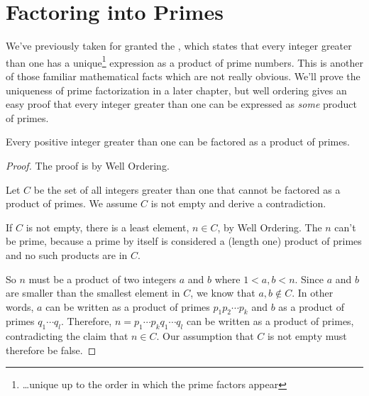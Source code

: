 \begin{problems}
\practiceproblems
{}

\classproblems
{}

\homeworkproblems
{}

\examproblems
{}
\end{problems}

\section{Factoring into Primes}

We've previously taken for granted the , which states that every integer greater than one has a
unique\footnote{\dots unique up to the order in which the prime
  factors appear} expression as a product of prime numbers.  This is
another of those familiar mathematical facts which are not really
obvious.  We'll prove the uniqueness of prime factorization in a later
chapter, but well ordering gives an easy proof that every integer
greater than one can be expressed as \emph{some} product of primes.

\begin{theorem}\label{factor_into_primes}
Every positive integer greater than one can be factored as a product of primes.
\end{theorem}
\begin{proof}
The proof is by Well Ordering.

Let $C$ be the set of all integers greater than one that cannot be
factored as a product of primes.  We assume $C$ is not empty and derive a
contradiction.

If $C$ is not empty, there is a least element, $n \in C$, by Well
Ordering.  The $n$ can't be prime, because a prime by itself is considered
a (length one) product of primes and no such products are in $C$.

So $n$ must be a product of two integers $a$ and $b$ where $1<a,b<n$.
Since $a$ and $b$ are smaller than the smallest element in $C$, we know
that $a,b \notin C$.  In other words, $a$ can be written as a product of
primes $p_1p_2\cdots p_k$ and $b$ as a product of primes $q_1\cdots q_l$.
Therefore, $n=p_1\cdots p_k q_1 \cdots q_l$ can be written as a product of
primes, contradicting the claim that $n \in C$.  Our assumption that $C$
is not empty must therefore be false.
\end{proof}

